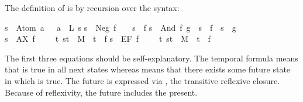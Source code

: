 \begin{isabellebody}
\begin{isamarkuptext}
The definition of \isa{{\isasymTurnstile}} is by recursion over the syntax:%
\end{isamarkuptext}%
\isanewline
{\isachardoublequote}s\ {\isasymTurnstile}\ Atom\ a\ \ {\isacharequal}\ {\isacharparenleft}a\ {\isasymin}\ L\ s{\isacharparenright}{\isachardoublequote}\isanewline
{\isachardoublequote}s\ {\isasymTurnstile}\ Neg\ f\ \ \ {\isacharequal}\ {\isacharparenleft}{\isasymnot}{\isacharparenleft}s\ {\isasymTurnstile}\ f{\isacharparenright}{\isacharparenright}{\isachardoublequote}\isanewline
{\isachardoublequote}s\ {\isasymTurnstile}\ And\ f\ g\ {\isacharequal}\ {\isacharparenleft}s\ {\isasymTurnstile}\ f\ {\isasymand}\ s\ {\isasymTurnstile}\ g{\isacharparenright}{\isachardoublequote}\isanewline
{\isachardoublequote}s\ {\isasymTurnstile}\ AX\ f\ \ \ \ {\isacharequal}\ {\isacharparenleft}{\isasymforall}t{\isachardot}\ {\isacharparenleft}s{\isacharcomma}t{\isacharparenright}\ {\isasymin}\ M\ {\isasymlongrightarrow}\ t\ {\isasymTurnstile}\ f{\isacharparenright}{\isachardoublequote}\isanewline
{\isachardoublequote}s\ {\isasymTurnstile}\ EF\ f\ \ \ \ {\isacharequal}\ {\isacharparenleft}{\isasymexists}t{\isachardot}\ {\isacharparenleft}s{\isacharcomma}t{\isacharparenright}\ {\isasymin}\ M\isactrlsup {\isacharasterisk}\ {\isasymand}\ t\ {\isasymTurnstile}\ f{\isacharparenright}{\isachardoublequote}%
\begin{isamarkuptext}%
\noindent
The first three equations should be self-explanatory. The temporal formula
 means that  is true in all next states whereas
 means that there exists some future state in which  is
true. The future is expressed via \isa{\isactrlsup {\isacharasterisk}}, the transitive reflexive
closure. Because of reflexivity, the future includes the present.


\end{isamarkuptext}
\end{isabellebody}
